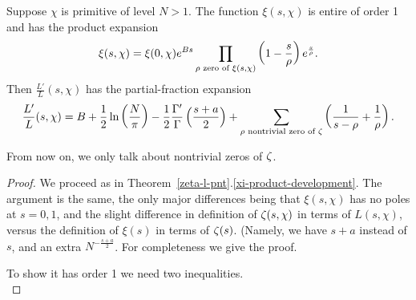 \begin{thm}
Suppose $\chi$ is primitive of level $N>1$.
The function $\xi(s,\chi)$ is entire of order 1 and has the product expansion
\[
\xi(s,\chi)=\xi(0,\chi)e^{Bs}\prod_{\rho\text{ zero of }\xi(s,\chi)} \left( {1-\frac s{\rho}} \right)e^{\frac s{\rho}}.
\]
Then $\frac{L'}{L}(s,\chi)$ has the partial-fraction expansion
\[
\frac{L'}{L}(s,\chi)=B+\rc{2}\ln\pf{N}{\pi}%
-\rc{2}\frac{\Ga'}{\Ga}\pf{s+a}{2}
+\sum_{\rh\text{ nontrivial zero of }\zeta}\pa{\rc{s-\rh}+\rc{\rh}}.
\]
\end{thm}
From now on, we only talk about nontrivial zeros of $\zeta$.
\begin{proof}
We proceed as in Theorem~\ref{zeta-l-pnt}.\ref{xi-product-development}. 
The argument is the same, the only major differences being that $\xi(s,\chi)$ has no poles at $s=0,1$, and the slight difference in definition of $\zeta(s,\chi)$ in terms of $L(s,\chi)$, versus the definition of $\xi(s)$ in terms of $\zeta(s)$. (Namely, we have $s+a$ instead of $s$, and an extra $N^{-\frac{s+a}2}$. For completeness we give the proof.

To show it has order 1 we need two inequalities.\\


\end{proof}
